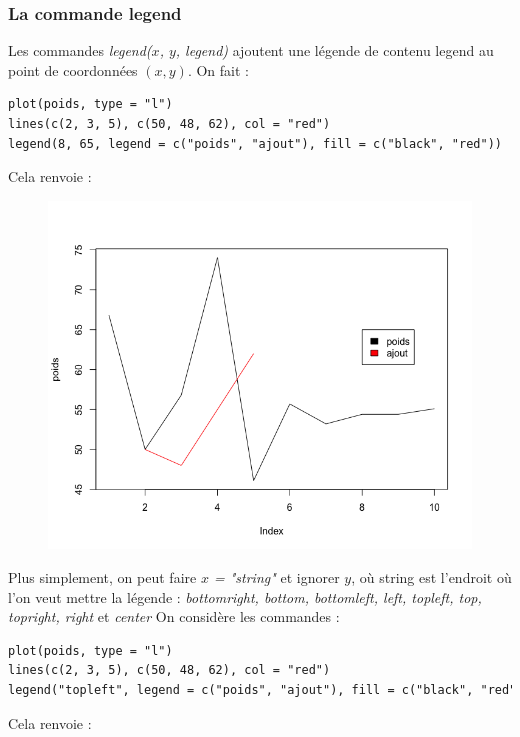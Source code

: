 \subsubsection{La commande legend}
Les commandes \textit{legend($x$, $y$, legend)} ajoutent une légende de contenu legend au point de coordonnées $(x, y)$.\newline
On fait :
\begin{lstlisting}[language=html]
plot(poids, type = "l")
lines(c(2, 3, 5), c(50, 48, 62), col = "red")
legend(8, 65, legend = c("poids", "ajout"), fill = c("black", "red"))
\end{lstlisting}
Cela renvoie :
\begin{figure}[H]\begin{center}\includegraphics[scale=0.4]{ilu/gra67.png}\end{center}\end{figure}
Plus simplement, on peut faire \textit{$x$ = "string"} et ignorer $y$, où string est l'endroit où l'on veut mettre la légende : \textit{bottomright, bottom, bottomleft, left, topleft, top, topright, right} et \textit{center}
On considère les commandes :
\begin{lstlisting}[language=html]
plot(poids, type = "l")
lines(c(2, 3, 5), c(50, 48, 62), col = "red")
legend("topleft", legend = c("poids", "ajout"), fill = c("black", "red"))
\end{lstlisting}
Cela renvoie :
